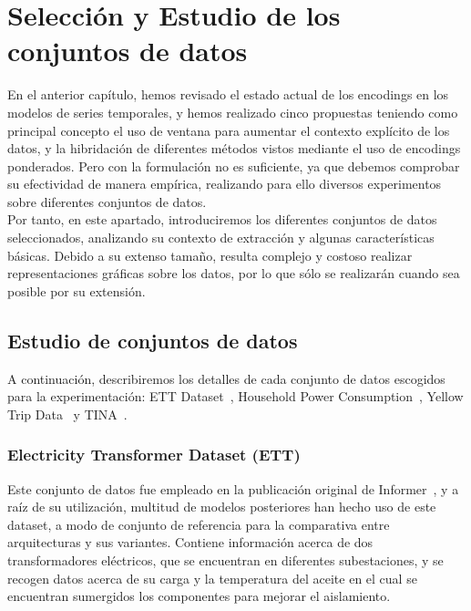 \chapter{Selección y Estudio de los conjuntos de datos}

En el anterior capítulo, hemos revisado el estado actual de los encodings en los modelos de series temporales, y hemos realizado cinco propuestas teniendo como principal concepto el uso de ventana para aumentar el contexto explícito de los datos, y la hibridación de diferentes métodos vistos mediante el uso de encodings ponderados. Pero con la formulación no es suficiente, ya que debemos comprobar su efectividad de manera empírica, realizando para ello diversos experimentos sobre diferentes conjuntos de datos.\\

Por tanto, en este apartado, introduciremos los diferentes conjuntos de datos seleccionados, analizando su contexto de extracción y algunas características básicas. Debido a su extenso tamaño, resulta complejo y costoso realizar representaciones gráficas sobre los datos, por lo que sólo se realizarán cuando sea posible por su extensión.

\section{Estudio de conjuntos de datos}

A continuación, describiremos los detalles de cada conjunto de datos escogidos para la experimentación: ETT Dataset~\cite{zhou2021etdataset}, Household Power Consumption~\cite{hebrail2006individual}, Yellow Trip Data~\cite{nycopendata} y TINA~\cite{tina_dasci_arcelor}.

\subsection{Electricity Transformer Dataset (ETT)}

Este conjunto de datos fue empleado en la publicación original de Informer~\cite{zhou2021informerefficienttransformerlong}, y a raíz de su utilización, multitud de modelos posteriores han hecho uso de este dataset, a modo de conjunto de referencia para la comparativa entre arquitecturas y sus variantes. Contiene información acerca de dos transformadores eléctricos, que se encuentran en diferentes subestaciones, y se recogen datos acerca de su carga y la temperatura del aceite en el cual se encuentran sumergidos los componentes para mejorar el aislamiento.\\

